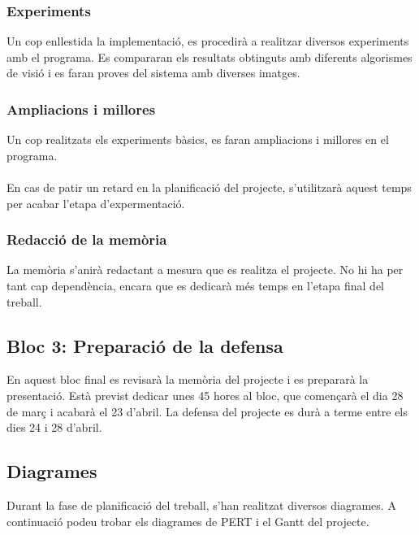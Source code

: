 		\subsubsection{Experiments}
			Un cop enllestida la implementació, es procedirà a realitzar diversos experiments amb el programa. Es compararan els resultats obtinguts amb diferents algorismes de visió i es faran
			proves del sistema amb diverses imatges.
		\subsubsection{Ampliacions i millores}
			Un cop realitzats els experiments bàsics, es faran ampliacions i millores en el programa.\\\\
			En cas de patir un retard en la planificació del projecte, s'utilitzarà aquest temps per acabar l'etapa d'expermentació.
		\subsubsection{Redacció de la memòria}
			La memòria s'anirà redactant a mesura que es realitza el projecte. No hi ha per tant cap dependència, encara que es dedicarà més temps en l'etapa final del treball.\\

	\subsection{Bloc 3: Preparació de la defensa}
	En aquest bloc final es revisarà la memòria del projecte i es prepararà la presentació. Està previst dedicar unes 45 hores al bloc, que començarà el dia 28 de març i acabarà el 23 d'abril.
	La defensa del projecte es durà a terme entre els dies 24 i 28 d'abril.

	\subsection{Diagrames}
		Durant la fase de planificació del treball, s'han realitzat diversos diagrames. A continuació podeu trobar els diagrames de PERT i el Gantt del projecte.\\

